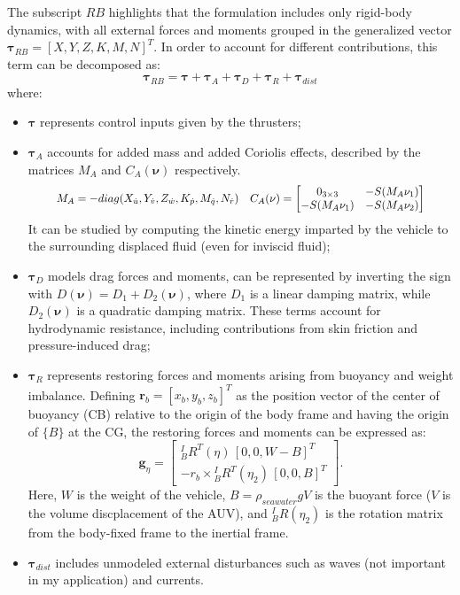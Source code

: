 The subscript $RB$ highlights that the formulation includes only rigid-body dynamics, with all external forces and moments grouped in the generalized vector
$\mathbf{\tau}_{RB} = [X, Y, Z, K, M, N]^T$. In order to account for different contributions, this term can be decomposed as:
\begin{equation}
    \mathbf{\tau}_{RB} = \mathbf{\tau} + \mathbf{\tau}_{A} + \mathbf{\tau}_{D} + \mathbf{\tau}_{R} + \mathbf{\tau}_{dist}
    \label{eq:6dof_tau_simple}
\end{equation}
where:
\begin{itemize}
    \item $\mathbf{\tau}$ represents control inputs given by the thrusters;
    \item $\mathbf{\tau}_{A}$ accounts for added mass and added Coriolis effects, described by the matrices $M_A$ and $C_A(\mathbf{\nu})$ respectively. 
    \begin{equation}
        \scalebox{0.9}{
            $ M_A = -diag(X_{\dot{u}}, Y_{\dot{v}}, Z_{\dot{w}}, K_{\dot{p}}, M_{\dot{q}}, N_{\dot{r}}) \quad
            C_A(\mathbf{\nu}) = \begin{bmatrix}
            0_{3 \times 3} & -S(M_A\mathbf{\nu}_1) \\
            -S(M_A\mathbf{\nu}_1) & -S(M_A\mathbf{\nu}_2)
            \end{bmatrix} $
        }
        \label{eq:added_mass}
    \end{equation}
    It can be studied by computing the kinetic energy imparted by the vehicle to the surrounding displaced fluid (even for inviscid fluid);
    \item $\mathbf{\tau}_{D}$ models drag forces and moments, can be represented by inverting the sign with 
    $D(\mathbf{\nu}) = D_1 + D_2(\mathbf{\nu})$, where $D_1$ is a linear damping matrix, while $D_2(\mathbf{\nu})$ is a quadratic damping matrix. 
    These terms account for hydrodynamic resistance, including contributions from skin friction and pressure-induced drag;
    \item $\mathbf{\tau}_{R}$ represents restoring forces and moments arising from buoyancy and weight imbalance. Defining $\mathbf{r}_b = [x_b, y_b, z_b]^T$ as the 
    position vector of the center of buoyancy (CB) relative to the origin of the body frame and having the origin of $\{B\}$ at the CG,
    the restoring forces and moments can be expressed as:
    \begin{equation}
        \mathbf{g}_{\eta} = \begin{bmatrix}
            {}^I_B R^T(\eta)\,[0,0,W-B]^T\\
            - r_b\times {}^I_B R^T(\eta_2)\,[0,0,B]^T
        \end{bmatrix}.
        \label{eq:restoring_forces}
    \end{equation}
    Here, $W$ is the weight of the vehicle, $B = \rho_{seawater} g V$ is the buoyant force ($V$ is the volume discplacement of the AUV), and ${}^I_B R(\eta_2)$ is the rotation matrix from the body-fixed frame to the inertial frame.
    \item $\mathbf{\tau}_{dist}$ includes unmodeled external disturbances such as waves (not important in my application) and currents.
\end{itemize}
